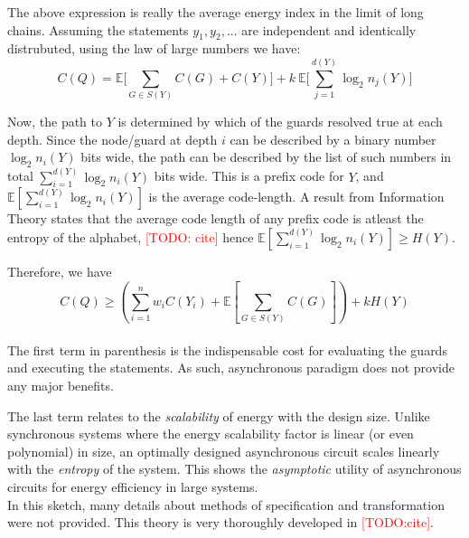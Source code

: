 The above expression is really the average energy index in the limit of long
chains. Assuming the statements $y_1, y_2, ...$ are independent and identically
distrubuted, using the law of large numbers we have:
\begin{equation}\label{eqn:simplified_cost}
	C(Q) = \mathbb{E} \Big[\sum_{G \in S(Y)} C(G) + C(Y) \Big] 
		+ k\ \mathbb{E} \Big[\sum_{j=1}^{d(Y)} \log_2{n_{j}(Y)} \Big] 
\end{equation}

Now, the path to $Y$ is determined by which of the guards resolved true at each
depth. Since the node/guard at depth $i$ can be
described by a binary number $\log_2{n_i(Y)}$ bits wide, the path can be
described by the list of such numbers in total 
$\sum_{i=1}^{d(Y)} \log_2 n_i(Y)$ bits
wide. This is a prefix code for $Y$, and 
$\mathbb{E}[\sum_{i=1}^{d(Y)} \log_2n_i(Y)]$
is the average code-length. A result from Information Theory states that the
average code length of any prefix code is atleast the entropy of the alphabet,
\textcolor{red}{[TODO: cite]}
hence $\mathbb{E}[\sum_{i=1}^{d(Y)} \log_2n_i(Y)] \ge H(Y)$. 

Therefore, we have 
\begin{equation}
	C(Q) \ge (\sum_{i=1}^{n} w_i C(Y_i) + \mathbb{E}[\sum_{G \in S(Y)} C(G)] ) + k H(Y)
\end{equation}
\\

The first term in parenthesis is the indispensable cost for evaluating the guards
and executing the statements. As such, asynchronous paradigm does not provide
any major benefits.

The last term relates to the \emph{scalability}
of energy with the design size. Unlike synchronous systems where the energy scalability
factor is linear (or even polynomial) in size, an optimally designed
asynchronous circuit scales linearly with the \emph{entropy} of the system. 
This shows the \emph{asymptotic} utility of asynchronous circuits
for energy efficiency in large systems.
\\

In this sketch, many details about methods of specification and
transformation were not provided. This theory is very thoroughly 
developed in \textcolor{red}{[TODO:cite]}. 
